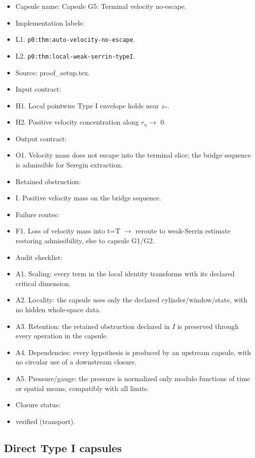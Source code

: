 \documentclass[11pt]{amsart}
\begin{document}
\begin{itemize}
  \item Capsule name: Capsule G5: Terminal velocity no-escape.
  \item Implementation labels:
  \item L1. \texttt{p0:thm:auto-velocity-no-escape}.
  \item L2. \texttt{p0:thm:local-weak-serrin-typeI}.
  \item Source: proof\_setup.tex.
  \item Input contract:
  \item H1. Local pointwise Type I envelope holds near $z_*$.
  \item H2. Positive velocity concentration along $r_n \to$ 0.
  \item Output contract:
  \item O1. Velocity mass does not escape into the terminal slice; the bridge sequence is admissible for Seregin extraction.
  \item Retained obstruction:
  \item I. Positive velocity mass on the bridge sequence.
  \item Failure routes:
  \item F1. Loss of velocity mass into t=T $\to$ reroute to weak-Serrin estimate restoring admissibility, else to capsule G1/G2.
  \item Audit checklist:
  \item A1. Scaling: every term in the local identity transforms with its declared critical dimension.
  \item A2. Locality: the capsule uses only the declared cylinder/window/state, with no hidden whole-space data.
  \item A3. Retention: the retained obstruction declared in $I$ is preserved through every operation in the capsule.
  \item A4. Dependencies: every hypothesis is produced by an upstream capsule, with no circular use of a downstream closure.
  \item A5. Pressure/gauge: the pressure is normalized only modulo functions of time or spatial means, compatibly with all limits.
  \item Closure status:
  \item verified (transport).
\end{itemize}

\subsection{Direct Type I capsules}
\end{document}
